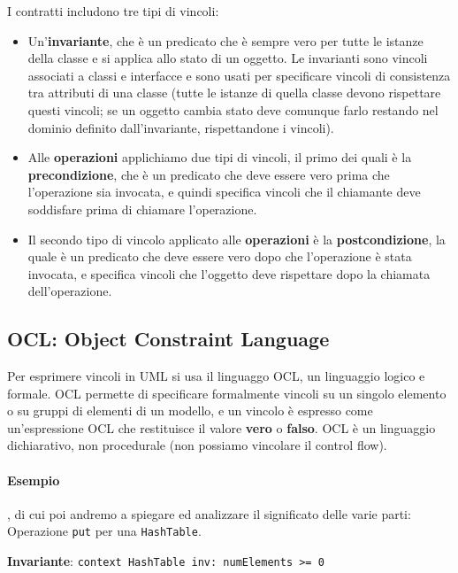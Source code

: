             I contratti includono tre tipi di vincoli:
            \begin{itemize}
                \item Un'\textbf{invariante}, che è un predicato che è sempre vero per tutte le istanze della classe e si applica allo stato di un oggetto. Le invarianti sono vincoli associati a classi e interfacce e sono usati per specificare vincoli di consistenza tra attributi di una classe (tutte le istanze di quella classe devono rispettare questi vincoli; se un oggetto cambia stato deve comunque farlo restando nel dominio definito dall'invariante, rispettandone i vincoli).
                \item Alle \textbf{operazioni} applichiamo due tipi di vincoli, il primo dei quali è la \textbf{precondizione}, che è un predicato che deve essere vero prima che l'operazione sia invocata, e quindi specifica vincoli che il chiamante deve soddisfare prima di chiamare l'operazione.
                \item Il secondo tipo di vincolo applicato alle \textbf{operazioni} è la \textbf{postcondizione}, la quale è un predicato che deve essere vero dopo che l'operazione è stata invocata, e specifica vincoli che l'oggetto deve rispettare dopo la chiamata dell'operazione.
            \end{itemize}
            
        \subsection{OCL: Object Constraint Language}
            Per esprimere vincoli in UML si usa il linguaggo OCL, un linguaggio logico e formale. OCL permette di specificare formalmente vincoli su un singolo elemento o su gruppi di elementi di un modello, e un vincolo è espresso come un'espressione OCL che restituisce il valore \textbf{vero} o \textbf{falso}. OCL è un linguaggio dichiarativo, non procedurale (non possiamo vincolare il control flow).
            
            \paragraph{Esempio}, di cui poi andremo a spiegare ed analizzare il significato delle varie parti: Operazione \texttt{put} per una \texttt{HashTable}.
            
            \textbf{Invariante}: \texttt{context HashTable inv: numElements >= 0}
            
